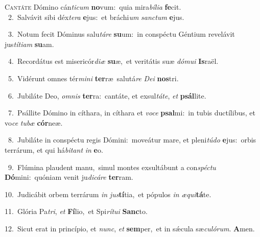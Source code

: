 \lettrine{\initial\textcolor{\initialcolor}{C}}{antáte} Dómino cán\-\textit{ti}\-\textit{cum} \textbf{no}\-vum:~\star quia mira\-\textit{bí}\-\textit{li}\textit{a} \textbf{fe}\-cit.\\
{\numbfont\textcolor{\numbcolor}{~2.}}~Salvávit sibi déx\-\textit{te}\-\textit{ra} \textbf{e}\-jus:~\star et bráchi\textit{um} \textit{sanc}\-\textit{tum} \textbf{e}\-jus.\par
{\numbfont\textcolor{\numbcolor}{~3.}}~Notum fecit Dóminus salu\-\textit{tá}\-\textit{re} \textbf{su}\-um:~\star in conspéctu Géntium revelávit jus\-\textit{tí}\-\textit{ti}\textit{am} \textbf{su}\-am.\par
{\numbfont\textcolor{\numbcolor}{~4.}}~Recordátus est misericór\-\textit{di}\-\textit{æ} \textbf{su}\-æ,~\star et veritátis suæ \textit{dó}\-\textit{mu}\textit{i} \textbf{Is}\-raël.\par
{\numbfont\textcolor{\numbcolor}{~5.}}~Vidérunt omnes tér\-\textit{mi}\-\textit{ni} \textbf{ter}\-ræ~\star salutá\textit{re} \textit{De}\-\textit{i} \textbf{nos}\-tri.\par
{\numbfont\textcolor{\numbcolor}{~6.}}~Jubiláte Deo, \textit{om}\-\textit{nis} \textbf{ter}\-ra:~\star cantáte, et exsul\-\textit{tá}\-\textit{te}, \textit{et} \textbf{psál}\-lite.\par
{\numbfont\textcolor{\numbcolor}{~7.}}~Psállite Dómino in cíthara, in cíthara et \textit{vo}\-\textit{ce} \textbf{psal}\-mi:~\star in tubis ductílibus, et vo\textit{ce} \textit{tu}\-\textit{bæ} \textbf{cór}\-neæ.\par
{\numbfont\textcolor{\numbcolor}{~8.}}~Jubiláte in conspéctu regis Dómini:~\dagger moveátur mare, et pleni\-\textit{tú}\-\textit{do} \textbf{e}\-jus:~\star orbis terrárum, et qui há\-\textit{bi}\-\textit{tant} \textit{in} \textbf{e}\-o.\par
{\numbfont\textcolor{\numbcolor}{~9.}}~Flúmina plaudent manu,~\dagger simul montes exsultábunt a con\-\textit{spéc}\-\textit{tu} \textbf{Dó}\-mini:~\star quóniam venit ju\-\textit{di}\-\textit{cá}\textit{re} \textbf{ter}\-ram.\par
{\numbfont\textcolor{\numbcolor}{10.}}~Judicábit orbem terrárum \textit{in} \textit{jus}\-\textbf{tí}tia,~\star et pópulos \textit{in} \textit{æ}\-\textit{qui}\textbf{tá}te.\par
{\numbfont\textcolor{\numbcolor}{11.}}~Glória Pa\-\textit{tri}\-, \textit{et} \textbf{Fí}\-lio,~\star et Spi\-\textit{rí}\-\textit{tu}\textit{i} \textbf{Sanc}\-to.\par
{\numbfont\textcolor{\numbcolor}{12.}}~Sicut erat in princípio, et \textit{nunc}\-, \textit{et} \textbf{sem}\-per,~\star et in sǽcula sæ\-\textit{cu}\-\textit{ló}\textit{rum}. \textbf{A}\-men.\par
